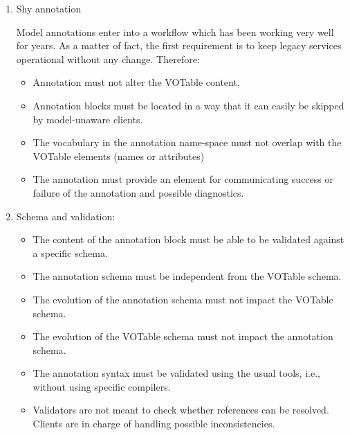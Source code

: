 \begin {enumerate}
  \item Shy annotation 
  
  	Model annotations enter into a workflow which has been working very well for years. As a matter of fact, the first requirement is to keep 
	legacy services operational without any change. Therefore: 
	
  \begin {itemize}
    \item Annotation must not alter the VOTable content.
    \item Annotation blocks must be located in a way that it can easily be skipped by model-unaware clients.
    \item The vocabulary in the annotation name-space must not overlap with the VOTable elements (names or attributes)    
    \item The annotation must provide an element for communicating success or failure of the annotation 
          and possible diagnostics.
  \end {itemize}
  
  \item Schema and validation:
  \begin {itemize}
     \item The content of the annotation block must be able to be validated against a specific schema.
    \item The annotation schema must be independent from the VOTable schema.
    \item The evolution of the annotation schema must not impact the VOTable schema.
    \item The evolution of the VOTable schema must not impact the annotation schema.
    \item The annotation syntax must be validated using the usual tools, i.e., without using specific compilers.
    \item Validators are not meant to check whether references can be resolved. Clients are in charge of handling possible inconsistencies.
  \end {itemize}
  

\end{enumerate}
